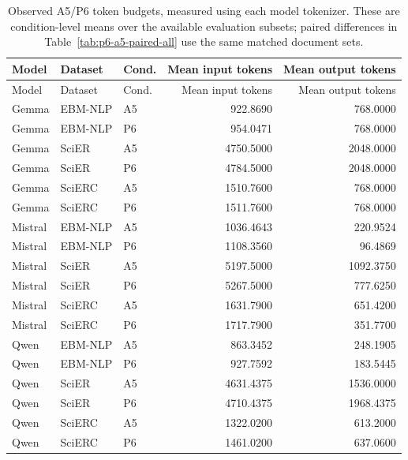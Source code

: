 \documentclass[fleqn,10pt]{wlscirep-authoryear}
\begin{document}
\begingroup
\footnotesize
\setlength{\tabcolsep}{4pt}
\setlength{\LTleft}{0pt}
\setlength{\LTright}{0pt}
\begin{longtable}{lllrr}
\caption{Observed A5/P6 token budgets, measured using each model tokenizer. These are condition-level means over the available evaluation subsets; paired differences in Table~\ref{tab:p6-a5-paired-all} use the same matched document sets.}\label{tab:r1-condition-tokens}\\
\toprule
Model & Dataset & Cond. & Mean input tokens & Mean output tokens \\
\midrule
\endfirsthead
\toprule
Model & Dataset & Cond. & Mean input tokens & Mean output tokens \\
\midrule
\endhead
\bottomrule
\endfoot
Gemma & EBM-NLP & A5 & 922.8690 & 768.0000 \\
Gemma & EBM-NLP & P6 & 954.0471 & 768.0000 \\
\addlinespace[2pt]
Gemma & SciER & A5 & 4750.5000 & 2048.0000 \\
Gemma & SciER & P6 & 4784.5000 & 2048.0000 \\
\addlinespace[2pt]
Gemma & SciERC & A5 & 1510.7600 & 768.0000 \\
Gemma & SciERC & P6 & 1511.7600 & 768.0000 \\
\addlinespace[2pt]
Mistral & EBM-NLP & A5 & 1036.4643 & 220.9524 \\
Mistral & EBM-NLP & P6 & 1108.3560 & 96.4869 \\
\addlinespace[2pt]
Mistral & SciER & A5 & 5197.5000 & 1092.3750 \\
Mistral & SciER & P6 & 5267.5000 & 777.6250 \\
\addlinespace[2pt]
Mistral & SciERC & A5 & 1631.7900 & 651.4200 \\
Mistral & SciERC & P6 & 1717.7900 & 351.7700 \\
\addlinespace[2pt]
Qwen & EBM-NLP & A5 & 863.3452 & 248.1905 \\
Qwen & EBM-NLP & P6 & 927.7592 & 183.5445 \\
\addlinespace[2pt]
Qwen & SciER & A5 & 4631.4375 & 1536.0000 \\
Qwen & SciER & P6 & 4710.4375 & 1968.4375 \\
\addlinespace[2pt]
Qwen & SciERC & A5 & 1322.0200 & 613.2000 \\
Qwen & SciERC & P6 & 1461.0200 & 637.0600 \\
\end{longtable}
\endgroup
\end{document}
